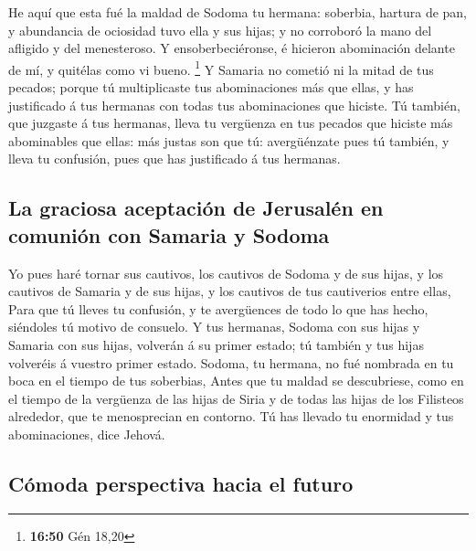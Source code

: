  He aquí que esta fué la maldad de Sodoma tu hermana:
soberbia, hartura de pan, y abundancia de ociosidad tuvo ella y sus
hijas; y no corroboró la mano del afligido y del menesteroso.
 Y ensoberbeciéronse, é hicieron abominación delante de
mí, y quitélas como vi bueno. \footnote{\textbf{16:50} Gén 18,20}
 Y Samaria no cometió ni la mitad de tus pecados; porque
tú multiplicaste tus abominaciones más que ellas, y has justificado á
tus hermanas con todas tus abominaciones que hiciste.  Tú
también, que juzgaste á tus hermanas, lleva tu vergüenza en tus pecados
que hiciste más abominables que ellas: más justas son que tú:
avergüénzate pues tú también, y lleva tu confusión, pues que has
justificado á tus hermanas.

\hypertarget{la-graciosa-aceptaciuxf3n-de-jerusaluxe9n-en-comuniuxf3n-con-samaria-y-sodoma}{%
\subsection{La graciosa aceptación de Jerusalén en comunión con Samaria
y
Sodoma}\label{la-graciosa-aceptaciuxf3n-de-jerusaluxe9n-en-comuniuxf3n-con-samaria-y-sodoma}}

 Yo pues haré tornar sus cautivos, los cautivos de Sodoma
y de sus hijas, y los cautivos de Samaria y de sus hijas, y los cautivos
de tus cautiverios entre ellas,  Para que tú lleves tu
confusión, y te avergüences de todo lo que has hecho, siéndoles tú
motivo de consuelo.  Y tus hermanas, Sodoma con sus hijas
y Samaria con sus hijas, volverán á su primer estado; tú también y tus
hijas volveréis á vuestro primer estado.  Sodoma, tu
hermana, no fué nombrada en tu boca en el tiempo de tus soberbias,
 Antes que tu maldad se descubriese, como en el tiempo de
la vergüenza de las hijas de Siria y de todas las hijas de los Filisteos
alrededor, que te menosprecian en contorno.  Tú has
llevado tu enormidad y tus abominaciones, dice Jehová.

\hypertarget{cuxf3moda-perspectiva-hacia-el-futuro}{%
\subsection{Cómoda perspectiva hacia el
futuro}\label{cuxf3moda-perspectiva-hacia-el-futuro}}

